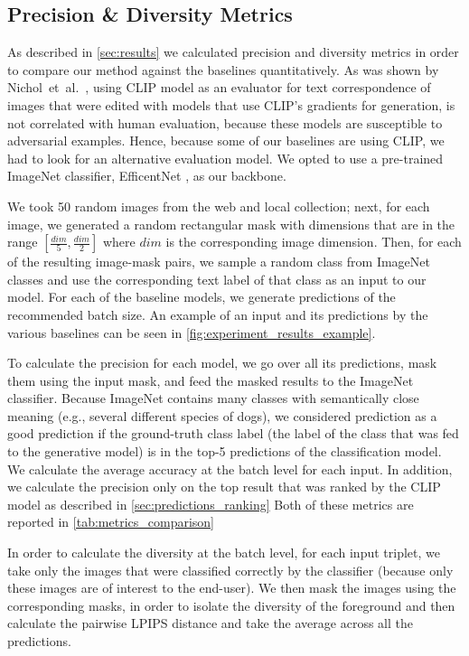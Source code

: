 \begin{appendix}
\subsection{Precision \& Diversity Metrics}
\label{sec:precision_and_diversity_supp}
As described in
\ref{sec:results}
we calculated precision and diversity metrics in order to compare our method against the baselines quantitatively. As was shown by Nichol~et~al.~, using CLIP model as an evaluator for text correspondence of images that were edited with models that use CLIP's gradients for generation, is not correlated with human evaluation, because these models are susceptible to adversarial examples. Hence, because some of our baselines are using CLIP, we had to look for an alternative evaluation model. We opted to use a pre-trained ImageNet classifier, EfficentNet \cite{tan2019efficientnet}, as our backbone.  

We took 50 random images from the web and local collection; next, for each image, we generated a random rectangular mask with dimensions that are in the range $[\frac{dim}{5}, \frac{dim}{2}]$ where $dim$ is the corresponding image dimension. Then, for each of the resulting image-mask pairs, we sample a random class from ImageNet classes and use the corresponding text label of that class as an input to our model. For each of the baseline models, we generate predictions of the recommended batch size. An example of an input and its predictions by the various baselines can be seen in \ref{fig:experiment_results_example}.

To calculate the precision for each model, we go over all its predictions, mask them using the input mask, and feed the masked results to the ImageNet classifier. Because ImageNet contains many classes with semantically close meaning (e.g., several different species of dogs), we considered prediction as a good prediction if the ground-truth class label (the label of the class that was fed to the generative model) is in the top-5 predictions of the classification model. We calculate the average accuracy at the batch level for each input. In addition, we calculate the precision only on the top result that was ranked by the CLIP model as described in
\ref{sec:predictions_ranking}
Both of these metrics are reported in \ref{tab:metrics_comparison}

In order to calculate the diversity at the batch level, for each input triplet, we take only the images that were classified correctly by the classifier (because only these images are of interest to the end-user). We then mask the images using the corresponding masks, in order to isolate the diversity of the foreground and then calculate the pairwise LPIPS \cite{zhang2018unreasonable} distance and take the average across all the predictions.


\end{appendix}
